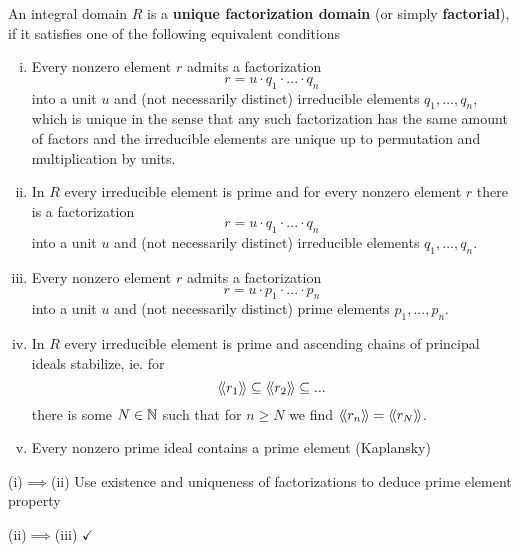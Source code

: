 	\begin{definition}
		An integral domain $R$ is a \textbf{unique factorization domain} (or simply \textbf{factorial}), if it satisfies one of the following equivalent conditions
		\begin{enumerate}[(i)]
			\item{
				Every nonzero element $r$ admits a factorization
				\begin{equation*}
					r = u\cdot q_1\cdot ...\cdot q_n
				\end{equation*}
				into a unit $u$ and (not necessarily distinct) irreducible elements $q_1,...,q_n$, which is unique in the sense that any such factorization has the same amount of factors and the irreducible elements are unique up to permutation and multiplication by units.
			}
			\item{
				In $R$ every irreducible element is prime and for every nonzero element $r$ there is a factorization
				\begin{equation*}
					r = u\cdot q_1\cdot ...\cdot q_n
				\end{equation*}
				into a unit $u$ and (not necessarily distinct) irreducible elements $q_1,...,q_n$.
			}
			\item{
				Every nonzero element $r$ admits a factorization
				\begin{equation*}
					r = u\cdot p_1\cdot ... \cdot p_n
				\end{equation*}
				into a unit $u$ and (not necessarily distinct) prime elements $p_1,...,p_n$.
			}
			\item{
				In $R$ every irreducible element is prime and ascending chains of principal ideals stabilize, ie. for
				\begin{equation*}
					\langle\!\langle r_1 \rangle\!\rangle \subseteq \langle\!\langle r_2 \rangle\!\rangle \subseteq ...
				\end{equation*}
				there is some $N \in \mathbb{N}$ such that for $n \geq N$ we find $\langle\!\langle r_n \rangle\!\rangle = \langle\!\langle r_N \rangle\!\rangle$.
			}
			\item{
				Every nonzero prime ideal contains a prime element (Kaplansky)
			}
		\end{enumerate}
	\end{definition}
	\begin{sketch}
		(i)$\implies$(ii) Use existence and uniqueness of factorizations to deduce prime element property

		(ii)$\implies$(iii) $\checkmark$
	\end{sketch}

	\begin{lemma}

	\end{lemma}

